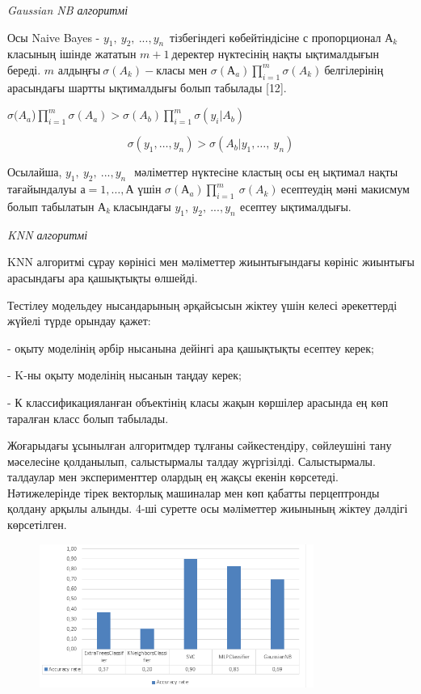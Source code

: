 \emph{Gaussian NB алгоритмі}

Осы Naive Bayes - \(y_{1},\ y_{2},\ ...,y_{n\ }\) тізбегіндегі
көбейтіндісіне с пропорционал \(А_{k}\)класының ішінде жататын
\(m + 1\ \)деректер нүктесінің нақты ықтималдығын береді. \(m\)
алдыңғы\(\ \sigma\left( A_{k} \right) -\)класы мен
\(\sigma\left( А_{a} \right)\prod_{i = 1}^{m}{}\sigma\left( A_{k} \right)\ \)белгілерінің
арасындағы шартты ықтималдығы болып табылады {[}12{]}.

\(\sigma(A_{a}\))\(\prod_{i = 1}^{m}{}\sigma\left( A_{a} \right) > \sigma(A_{b})\prod_{i = 1}^{m}{}\sigma(y_{i}|A_{b})\)

\[\sigma\left( y_{1},\ldots,y_{n} \right) > \sigma(A_{b}|y_{1},\ldots,\ y_{n})\]

Осылайша, \(y_{1},\ y_{2},\ ...,y_{n\ }\ \) мәліметтер нүктесіне кластың
осы ең ықтимал нақты тағайындалуы \(а = 1,\ldots,А\) үшін
\(\sigma\left( А_{a} \right)\prod_{i = 1}^{m}{}\ \sigma\left( A_{k} \right)\ \)есептеудің
мәні макисмум болып табылатын \(А_{k}\ \)класындағы
\(y_{1},\ y_{2},\ ...,y_{n\ }\ \)есептеу ықтималдығы.

\emph{KNN алгоритмі}

KNN алгоритмі сұрау көрінісі мен мәліметтер жиынтығындағы көрініс
жиынтығы арасындағы ара қашықтықты өлшейді.

Тестілеу модельдеу нысандарының әрқайсысын жіктеу үшін келесі
әрекеттерді жүйелі түрде орындау қажет:

- оқыту моделінің әрбір нысанына дейінгі ара қашықтықты есептеу керек;

- K-ны оқыту моделінің нысанын таңдау керек;

- К классификацияланған объектінің класы жақын көршілер арасында ең көп
таралған класс болып табылады.

Жоғарыдағы ұсынылған алгоритмдер тұлғаны сәйкестендіру, сөйлеушіні тану
мәселесіне қолданылып, салыстырмалы талдау жүргізілді. Салыстырмалы.
талдаулар мен эксперименттер олардың ең жақсы екенін көрсетеді.
Нәтижелерінде тірек векторлық машиналар мен көп қабатты перцептронды
қолдану арқылы алынды. 4-ші суретте осы мәліметтер жиынының жіктеу
дәлдігі көрсетілген.

\begin{figure}[H]
	\centering
	\includegraphics[width=0.8\textwidth]{media/ict/image8}
	\caption*{}
\end{figure}


